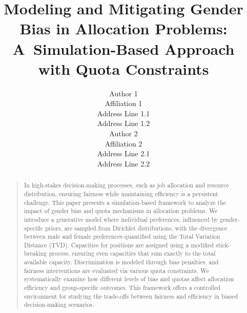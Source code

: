 \documentclass[letterpaper]{article}
\begin{document}
\title{Modeling and Mitigating Gender Bias in Allocation Problems: A~Simulation-Based Approach with Quota Constraints}
\author{Author 1\\
Affiliation 1\\
Address Line 1.1\\
Address Line 1.2\\
\And Author 2\\
Affiliation 2\\
Address Line 2.1\\
Address Line 2.2\\
}


\maketitle
\begin{abstract}
\begin{quote}
In high-stakes decision-making processes, such as job allocation and resource distribution, ensuring fairness while maintaining efficiency is a persistent challenge. This paper presents a simulation-based framework to analyze the impact of gender bias and quota mechanisms in allocation problems. We introduce a generative model where individual preferences, influenced by gender-specific priors, are sampled from Dirichlet distributions, with the divergence between male and female preferences quantified using the Total Variation Distance (TVD). Capacities for positions are assigned using a modified stick-breaking process, ensuring even capacities that sum exactly to the total available capacity. Discrimination is modeled through bias penalties, and fairness interventions are evaluated via various quota constraints. We systematically examine how different levels of bias and quotas affect allocation efficiency and group-specific outcomes. This framework offers a controlled environment for studying the trade-offs between fairness and efficiency in biased decision-making scenarios.
\end{quote}
\end{abstract}
\end{document}
